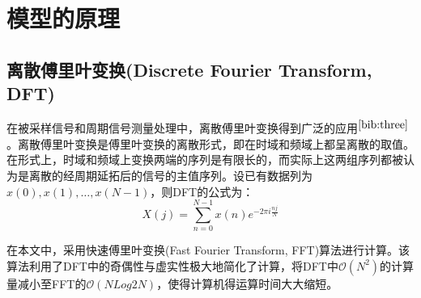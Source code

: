 \documentclass[bwprint]{cumcmthesis}
\begin{document}
    \section{模型的原理}
        \subsection{离散傅里叶变换(Discrete Fourier Transform, DFT)}
        在被采样信号和周期信号测量处理中，离散傅里叶变换得到广泛的应用$^{\cite{bib:three}}$。离散傅里叶变换是傅里叶变换的离散形式，即在时域和频域上都呈离散的取值。在形式上，时域和频域上变换两端的序列是有限长的，而实际上这两组序列都被认为是离散的经周期延拓后的信号的主值序列。设已有数据列为$x(0),x(1),\dots,x(N-1)$，则DFT的公式为：
        \begin{equation}
            \label{eq:DFT}
            X(j) = \sum_{n=0}^{N-1}x(n)e^{-2\pi i\frac{nj}{N}}
        \end{equation}
        
        在本文中，采用快速傅里叶变换(Fast Fourier Transform, FFT)算法进行计算。该算法利用了DFT中的奇偶性与虚实性极大地简化了计算，将DFT中$\mathcal{O}(N^2)$的计算量减小至FFT的$\mathcal{O}(NLog2N)$，使得计算机得运算时间大大缩短。
\end{document}

